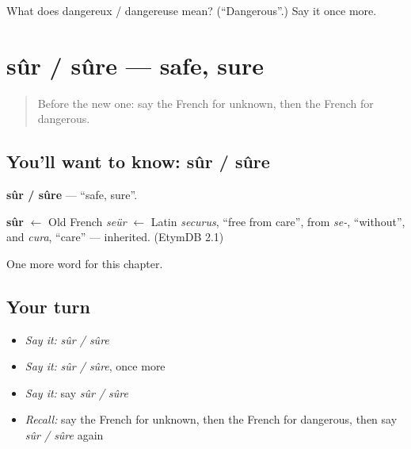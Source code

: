 \begin{tcolorbox}[breakable,colback=teal!4,colframe=teal!35!black,title={Before you move on}]
What does dangereux / dangereuse mean? (\textquotedblleft{}Dangerous\textquotedblright{}.) Say it once more.
\end{tcolorbox}
\section[sûr / sûre]{sûr / sûre — safe, sure}

\label{lesson:FR-C160-sur-sure}



\begin{quote}
Before the new one: say the French for unknown, then the French for dangerous.
\end{quote}

\subsection*{You'll want to know: sûr / sûre}
\textbf{sûr / sûre} — \textquotedblleft{}safe, sure\textquotedblright{}.

\begin{cousinweb}
\textbf{sûr} $\leftarrow$ Old French \emph{seür} $\leftarrow$ Latin \emph{securus}, \textquotedblleft{}free from care\textquotedblright{}, from \emph{se-}, \textquotedblleft{}without\textquotedblright{}, and \emph{cura}, \textquotedblleft{}care\textquotedblright{} — inherited. (EtymDB 2.1)
\end{cousinweb}

\begin{grammarlens}[title={What you've built}]
One more word for this chapter.
\end{grammarlens}

\subsection*{Your turn}
\begin{itemize}
\raggedright
  \item \emph{Say it:} \emph{sûr / sûre}
  \item \emph{Say it:} \emph{sûr / sûre}, once more
  \item \emph{Say it:} say \emph{sûr / sûre}
  \item \emph{Recall:} say the French for unknown, then the French for dangerous, then say \emph{sûr / sûre} again
\end{itemize}

